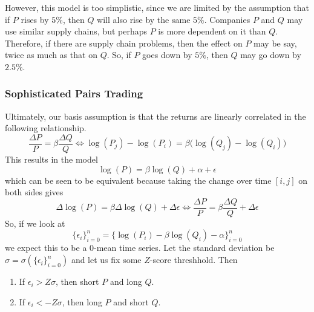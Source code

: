\documentclass{article}
\begin{document}
However, this model is too simplistic, since we are limited by the assumption that if $P$ rises by $5\%$, then $Q$ will also rise by the same $5\%$. Companies $P$ and $Q$ may use similar supply chains, but perhaps $P$ is more dependent on it than $Q$. Therefore, if there are supply chain problems, then the effect on $P$ may be say, twice as much as that on $Q$. So, if $P$ goes down by $5\%$, then $Q$ may go down by $2.5\%$. 

\subsubsection{Sophisticated Pairs Trading}
Ultimately, our basis assumption is that the returns are linearly correlated in the following relationship. 
\[\frac{\Delta P}{P} = \beta \frac{\Delta Q}{Q} \iff \log(P_j) - \log(P_i) = \beta \big( \log(Q_j) - \log(Q_i) \big)\]
This results in the model 
\[\log(P) = \beta \log(Q) + \alpha + \epsilon\]
which can be seen to be equivalent because taking the change over time $[i, j]$ on both sides gives 
\[\Delta \log(P) = \beta \Delta \log(Q) + \Delta \epsilon \iff \frac{\Delta P}{P} = \beta \frac{\Delta Q}{Q} + \Delta\epsilon \]
So, if we look at
\[\{\epsilon_i\}_{i=0}^n = \{\log(P_i) - \beta \log(Q_i) - \alpha\}_{i=0}^n \]
we expect this to be a $0$-mean time series. Let the standard deviation be $\sigma = \sigma(\{\epsilon_i\}_{i=0}^n)$ and let us fix some $Z$-score threshhold. Then 
\begin{enumerate}
    \item If $\epsilon_i > Z \sigma$, then short $P$ and long $Q$. 
    \item If $\epsilon_i < -Z \sigma$, then long $P$ and short $Q$. 
\end{enumerate}
\end{document}
